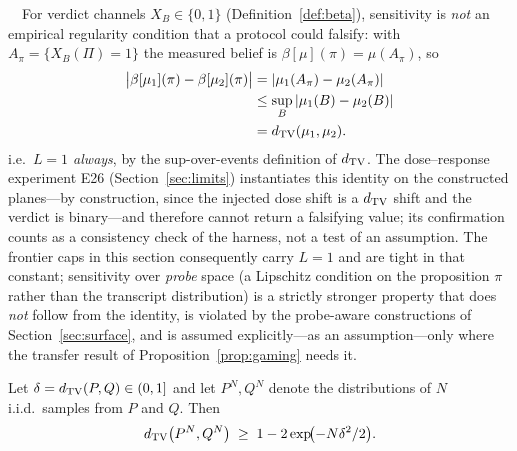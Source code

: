 \begin{remark}\label{rem:sens}\ \
For verdict channels $X_B\in\{0,1\}$ (Definition~\ref{def:beta}), sensitivity
is \emph{not} an empirical regularity condition that a protocol could
falsify: with $A_\pi=\{X_B(\Pi)=1\}$ the measured belief is
$\beta[\mu](\pi)=\mu(A_\pi)$, so
\[
\begin{aligned}
\bigl|\beta[\mu_1](\pi)-\beta[\mu_2](\pi)\bigr|
&=|\mu_1(A_\pi)-\mu_2(A_\pi)|\\
&\le\sup_B|\mu_1(B)-\mu_2(B)|\\
&=d_{\mathrm{TV}}(\mu_1,\mu_2).
\end{aligned}
\]
i.e.\ \emph{$L=1$ always}, by the sup-over-events definition of $d_{\mathrm{TV}}$.
The dose--response experiment E26 (Section~\ref{sec:limits}) instantiates
this identity on the constructed planes---by construction, since the
injected dose shift is a $d_{\mathrm{TV}}$ shift and the verdict is binary---and
therefore cannot return a falsifying value; its confirmation counts as a
consistency check of the harness, not a test of an assumption. The frontier
caps in this section consequently carry $L=1$ and are tight in that
constant; sensitivity over \emph{probe} space (a Lipschitz condition on the
proposition $\pi$ rather than the transcript distribution) is a strictly
stronger property that does \emph{not} follow from the identity, is
violated by the probe-aware constructions of
Section~\ref{sec:surface}, and is assumed explicitly---as an
assumption---only where the transfer result of
Proposition~\ref{prop:gaming} needs it.
\end{remark}

\begin{lemma}[Amplification]\label{lem:amp}
Let $\delta=d_{\mathrm{TV}}(P,Q)\in(0,1]$ and let $P^N,Q^N$ denote the distributions of
$N$ i.i.d.\ samples from $P$ and $Q$. Then
\[
d_{\mathrm{TV}}\bigl(P^{N},Q^{N}\bigr)\;\ge\;1-2\exp\!\bigl(-N\delta^{2}/2\bigr).
\]
\end{lemma}

